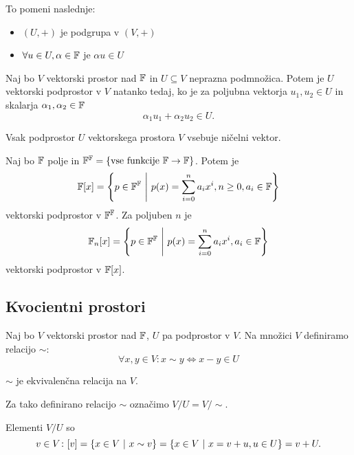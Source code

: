 \documentclass[12pt, a4paper]{article}
\begin{document}
\begin{opomba}
To pomeni naslednje:

\begin{itemize}
\item $(U,+)$ je podgrupa v $(V,+)$
\item $\forall u\in U,\alpha\in\mathbb{F}$ je $\alpha u\in U$
\end{itemize}
\end{opomba}

\begin{trditev}
Naj bo $V$ vektorski prostor nad $\mathbb{F}$ in $U\subseteq V$ neprazna podmnožica. Potem je $U$ vektorski podprostor v  $V$ natanko tedaj, ko je za poljubna vektorja $u_1,u_2\in U$ in skalarja $\alpha_1,\alpha_2\in\mathbb{F}$
\[
\alpha_1u_1+\alpha_2u_2\in U.
\]
\end{trditev}

\obvs

\begin{opomba}
Vsak podprostor $U$ vektorskega prostora $V$ vsebuje ničelni vektor.
\end{opomba}

\begin{trditev}
Naj bo $\mathbb{F}$ polje in $\mathbb{F}^{\mathbb{F}}=\left\{\text{vse funkcije $\mathbb{F}\to\mathbb{F}$}\right\}$. Potem je
\[
\mathbb{F}[x]=\left\{p\in\mathbb{F}^{\mathbb{F}}~\middle\vert~p(x)=\sum_{i=0}^na_ix^i,n\geq 0,a_i\in\mathbb{F}\right\}
\]
vektorski podprostor v $\mathbb{F}^{\mathbb{F}}$. Za poljuben $n$ je
\[
\mathbb{F}_n[x]=\left\{p\in\mathbb{F}^{\mathbb{F}}~\middle\vert~p(x)=\sum_{i=0}^na_ix^i,a_i\in\mathbb{F}\right\}
\]
vektorski podprostor v $\mathbb{F}[x]$.
\end{trditev}

\obvs

\newpage

\subsection{Kvocientni prostori}

\begin{definicija}
Naj bo $V$ vektorski prostor nad $\mathbb{F}$, $U$ pa podprostor v $V$. Na množici $V$ definiramo relacijo $\sim$:
\[
\forall x,y\in V\colon x\sim y\iff x-y\in U
\]
\end{definicija}

\begin{trditev}
$\sim$ je ekvivalenčna relacija na $V$.
\end{trditev}

\obvs

Za tako definirano relacijo $\sim$ označimo $V/U=V/{\sim}$.

Elementi $V/U$ so
\[
v\in V\colon [v]=\left\{x\in V~\middle\vert~x\sim v\right\}=\left\{x\in V~\middle\vert~x=v+u,u\in U\right\}=v+U.
\]
\end{document}
